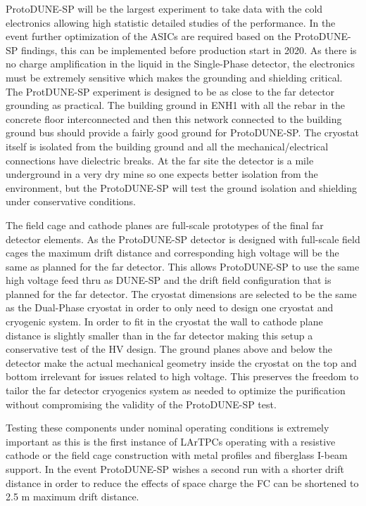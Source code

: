 ProtoDUNE-SP will be the largest experiment to take data with the cold electronics allowing high statistic detailed studies of the performance. In the event further optimization of the ASICs are required based on the ProtoDUNE-SP findings, this can be implemented before production start in 2020. As there is no charge amplification in the liquid in the Single-Phase detector, the electronics must be extremely sensitive which makes the grounding and shielding critical. The ProtDUNE-SP experiment is designed to be as close to the far detector grounding as practical. The building ground in ENH1 with all the rebar in the concrete floor interconnected and then this network connected to the building ground bus should provide a fairly good ground for ProtoDUNE-SP. The cryostat itself is isolated from the building ground and all the mechanical/electrical connections have dielectric breaks. At the far site the detector is a mile underground in a very dry mine so one expects better isolation from the environment, but the ProtoDUNE-SP will test the ground isolation and shielding under conservative conditions.

The field cage and cathode planes are full-scale prototypes of the final far detector elements. As the ProtoDUNE-SP detector is designed with full-scale field cages the maximum drift distance and corresponding high voltage will be the same as planned for the far detector. This allows ProtoDUNE-SP to use the same high voltage feed thru as DUNE-SP and the drift field configuration that is planned for the far detector. The cryostat dimensions are selected to be the same as the Dual-Phase cryostat in order to only need to design one cryostat and cryogenic system. In order to fit in the cryostat the wall to cathode plane distance is slightly smaller than in the far detector making this setup a conservative test of the HV design. The ground planes above and below the detector make the actual mechanical geometry inside the cryostat on the top and bottom irrelevant for issues related to high voltage. This preserves the freedom to tailor the far detector cryogenics system as needed to optimize the purification without compromising the validity of the ProtoDUNE-SP test. 

Testing these components under nominal operating conditions is extremely important as this is the first instance of LArTPCs operating with a resistive cathode or the field cage construction with metal profiles and fiberglass I-beam support. In the event ProtoDUNE-SP wishes a second run with a shorter drift distance in order to reduce the effects of space charge the FC can be shortened to 2.5 m maximum drift distance.

